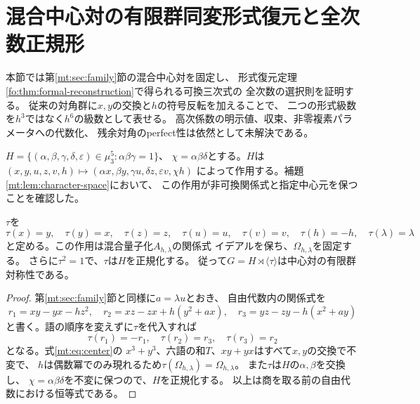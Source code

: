 \section{混合中心対の有限群同変形式復元と全次数正規形}
\label{mnf:sec:equivariant-normal-form}

本節では第\ref{mt:sec:family}節の混合中心対を固定し、
形式復元定理\ref{fo:thm:formal-reconstruction}で得られる可換三次式の
全次数の選択則を証明する。
従来の対角群に$x,y$の交換と$h$の符号反転を加えることで、
二つの形式級数を$h^3$ではなく$h^6$の級数として表せる。
高次係数の明示値、収束、非零複素パラメータへの代数化、
残余対角のperfect性は依然として未解決である。

$H=\{(\alpha,\beta,\gamma,\delta,\varepsilon)\in\mu_3^5:
\alpha\beta\gamma=1\}$、
$\chi=\alpha\beta\delta$とする。$H$は
$(x,y,u,z,v,h)\mapsto
(\alpha x,\beta y,\gamma u,\delta z,\varepsilon v,\chi h)$
によって作用する。補題\ref{mt:lem:character-space}において、
この作用が非可換関係式と指定中心元を保つことを確認した。

\begin{lemma}[交換対合と非可換中心対]
\label{mnf:lem:swap-involution}
$\tau$を
\[
 \tau(x)=y,\quad \tau(y)=x,\quad
 \tau(z)=z,\quad \tau(u)=u,\quad \tau(v)=v,\quad
 \tau(h)=-h,\quad \tau(\lambda)=\lambda
\]
と定める。この作用は混合量子化$A_{h,\lambda}$の関係式
イデアルを保ち、$\Omega_{h,\lambda}$を固定する。
さらに$\tau^2=1$で、$\tau$は$H$を正規化する。
従って$G=H\rtimes\langle\tau\rangle$は中心対の有限群対称性である。
\end{lemma}
\begin{proof}
第\ref{mt:sec:family}節と同様に$a=\lambda u$とおき、
自由代数内の関係式を
\[
 r_1=xy-yx-hz^2,\quad
 r_2=xz-zx+h(y^2+ax),\quad
 r_3=yz-zy-h(x^2+ay)
\]
と書く。語の順序を変えずに$\tau$を代入すれば
\[
 \tau(r_1)=-r_1,\quad \tau(r_2)=r_3,\quad \tau(r_3)=r_2
\]
となる。式\eqref{mt:eq:center}の
$x^3+y^3$、六語の和$T$、$xy+yx$はすべて$x,y$の交換で不変で、
$h$は偶数冪でのみ現れるため$\tau(\Omega_{h,\lambda})=\Omega_{h,\lambda}$。
また$\tau$は$H$の$\alpha,\beta$を交換し、
$\chi=\alpha\beta\delta$を不変に保つので、$H$を正規化する。
以上は商を取る前の自由代数における恒等式である。
\end{proof}

